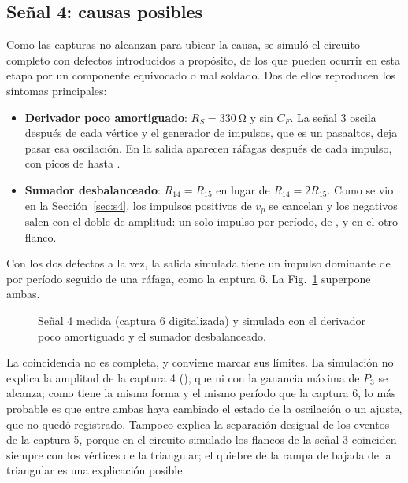 \subsection{Señal 4: causas posibles}
\label{sec:fallas}
Como las capturas no alcanzan para ubicar la causa, se simuló el circuito completo con defectos introducidos a propósito, de los que pueden ocurrir en esta etapa por un componente equivocado o mal soldado. Dos de ellos reproducen los síntomas principales:
\begin{itemize}[leftmargin=*, nosep]
    \item \textbf{Derivador poco amortiguado}: $R_S = \SI{330}{\ohm}$ y sin $C_F$. La señal 3 oscila después de cada vértice y el generador de impulsos, que es un pasaaltos, deja pasar esa oscilación. En la salida aparecen ráfagas después de cada impulso, con picos de hasta .
    \item \textbf{Sumador desbalanceado}: $R_{14} = R_{15}$ en lugar de $R_{14} = 2R_{15}$. Como se vio en la Sección~\ref{sec:s4}, los impulsos positivos de $v_p$ se cancelan y los negativos salen con el doble de amplitud: un solo impulso por período, de , y  en el otro flanco.
\end{itemize}
Con los dos defectos a la vez, la salida simulada tiene un impulso dominante de  por período seguido de una ráfaga, como la captura 6. La Fig.~\ref{fig:fallas} superpone ambas.

\begin{figure}[!htb]
\centering
{}
\caption{Señal 4 medida (captura 6 digitalizada) y simulada con el derivador poco amortiguado y el sumador desbalanceado.}
\label{fig:fallas}
\end{figure}

La coincidencia no es completa, y conviene marcar sus límites. La simulación no explica la amplitud de la captura 4 (), que ni con la ganancia máxima de $P_3$ se alcanza; como tiene la misma forma y el mismo período que la captura 6, lo más probable es que entre ambas haya cambiado el estado de la oscilación o un ajuste, que no quedó registrado. Tampoco explica la separación desigual de los eventos de la captura 5, porque en el circuito simulado los flancos de la señal 3 coinciden siempre con los vértices de la triangular; el quiebre de la rampa de bajada de la triangular es una explicación posible.

